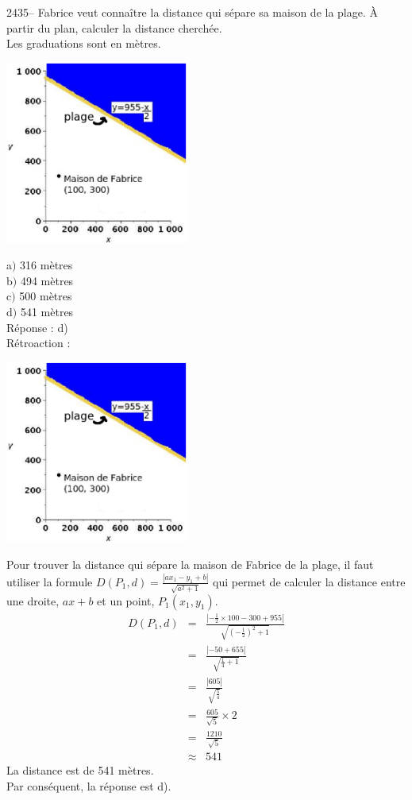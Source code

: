 \documentclass[letterpaper, 12pt]{article}
\begin{document}
2435-- Fabrice veut conna\^itre la distance qui s\'epare sa maison de la plage. \`A partir du plan, calculer la distance cherch\'ee.\\
Les graduations sont en m\`etres.\\
\begin{center}
 \includegraphics[width=6cm,bb=14 14 582 582]{Q2435q.eps}
\end{center}
a$)$  316 m\`etres\\
b$)$  494 m\`etres\\
c$)$  500 m\`etres\\
d$)$  541 m\`etres\\

R\'eponse : d) \\

R\'etroaction :\\
\begin{center}
 \includegraphics[width=6cm,bb=14 14 582 582]{Q2435q.eps}
\end{center}
Pour trouver la distance qui s\'epare la maison de Fabrice de la plage, il faut utiliser la formule $D(P_{1}, d)=\frac{|ax_{1}-y_{1}+b|}{\sqrt{a^{2}+1}}$ qui permet de calculer la distance entre une droite, $ax+b$ et un point, $P_{1}(x_{1},y_{1})$.
\begin{eqnarray*}
 D(P_{1}, d)&=&\frac{|-\frac{1}{2}\times 100-300+955|}{\sqrt{(-\frac{1}{2})^{2}+1}}\\[2mm]
&=&\frac{|-50+655|}{\sqrt{\frac{1}{4}+1}}\\[2mm]
&=&\frac{|605|}{\sqrt{\frac{5}{4}}}\\[2mm]
&=&\frac{605}{\sqrt{5}}\times 2\\[2mm]
&=&\frac{1210}{\sqrt{5}}\\[2mm]
&\approx&541
\end{eqnarray*}
La distance est de 541 m\`etres.\\
Par cons\'equent, la r\'eponse est d).\\
\end{document}
